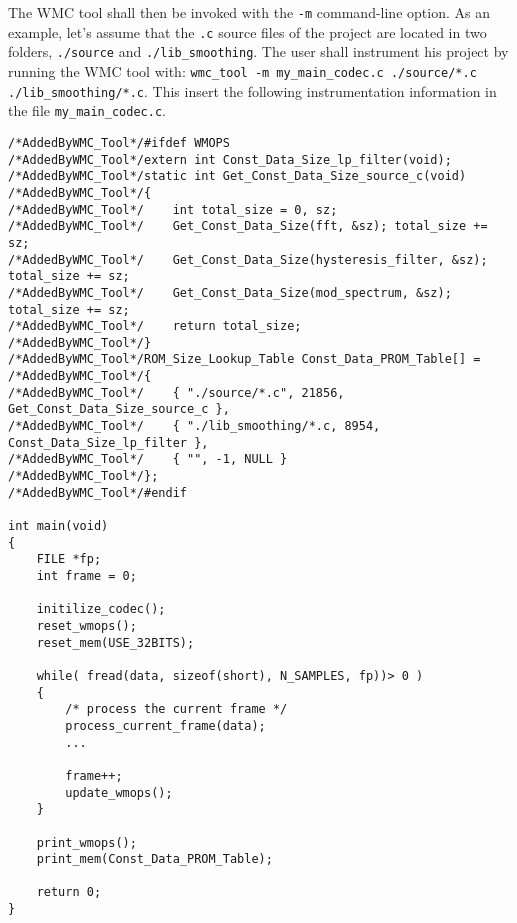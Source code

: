 The WMC tool shall then be invoked with the \verb|-m| command-line option. As an example, let's assume that the \verb|.c| source files of the project are located in two folders, \verb|./source| and \verb|./lib_smoothing|. The user shall instrument his project by running the WMC tool with: \verb|wmc_tool -m my_main_codec.c ./source/*.c ./lib_smoothing/*.c|. This insert the following instrumentation information in the file \verb|my_main_codec.c|.

\begin{Verbatim}[fontsize=\small]
/*AddedByWMC_Tool*/#ifdef WMOPS
/*AddedByWMC_Tool*/extern int Const_Data_Size_lp_filter(void);
/*AddedByWMC_Tool*/static int Get_Const_Data_Size_source_c(void)
/*AddedByWMC_Tool*/{
/*AddedByWMC_Tool*/    int total_size = 0, sz;
/*AddedByWMC_Tool*/    Get_Const_Data_Size(fft, &sz); total_size += sz;
/*AddedByWMC_Tool*/    Get_Const_Data_Size(hysteresis_filter, &sz); total_size += sz;
/*AddedByWMC_Tool*/    Get_Const_Data_Size(mod_spectrum, &sz); total_size += sz;
/*AddedByWMC_Tool*/    return total_size;
/*AddedByWMC_Tool*/}
/*AddedByWMC_Tool*/ROM_Size_Lookup_Table Const_Data_PROM_Table[] =
/*AddedByWMC_Tool*/{
/*AddedByWMC_Tool*/    { "./source/*.c", 21856, Get_Const_Data_Size_source_c },
/*AddedByWMC_Tool*/    { "./lib_smoothing/*.c, 8954, Const_Data_Size_lp_filter },
/*AddedByWMC_Tool*/    { "", -1, NULL }
/*AddedByWMC_Tool*/};
/*AddedByWMC_Tool*/#endif

int main(void)
{
    FILE *fp;
    int frame = 0;
    
    initilize_codec();
    reset_wmops();
    reset_mem(USE_32BITS);

    while( fread(data, sizeof(short), N_SAMPLES, fp))> 0 )
    {
        /* process the current frame */
        process_current_frame(data);
        ...
        
        frame++;
        update_wmops();
    }

    print_wmops();
    print_mem(Const_Data_PROM_Table);
    
    return 0;
}
\end{Verbatim}

